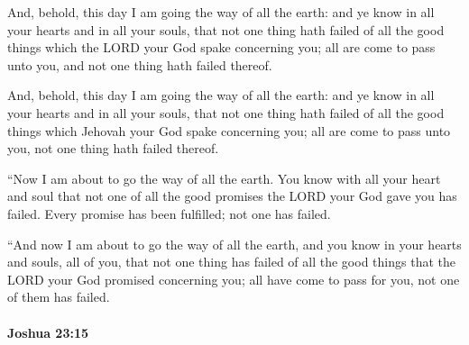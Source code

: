 			And, behold, this day I am going the way of all the earth: and ye know in all your hearts and in all your souls, that not one thing hath failed of all the good things which the LORD your God spake concerning you; all are come to pass unto you, and not one thing hath failed thereof.

			\begin{versebox}
					\item[BHS] 
					\item[ASV] And, behold, this day I am going the way of all the earth: and ye know in all your hearts and in all your souls, that not one thing hath failed of all the good things which Jehovah your God spake concerning you; all are come to pass unto you, not one thing hath failed thereof.
					\item[NIV] “Now I am about to go the way of all the earth. You know with all your heart and soul that not one of all the good promises the LORD your God gave you has failed. Every promise has been fulfilled; not one has failed.
					\item[NRSV] “And now I am about to go the way of all the earth, and you know in your hearts and souls, all of you, that not one thing has failed of all the good things that the LORD your God promised concerning you; all have come to pass for you, not one of them has failed.
			\end{versebox}

		\paragraph{Joshua 23:15} %
			\label{JOSHUA-23-15}

